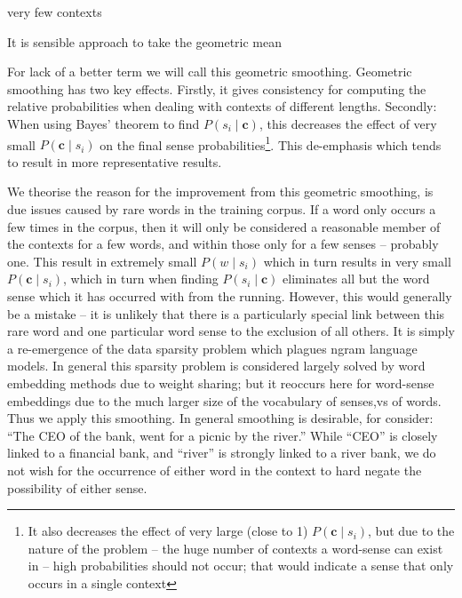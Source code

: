 \documentclass{sig-alternate}
\renewcommand{\c}{\mathbf{c}}
\begin{document}
 

very few contexts 


It is sensible approach to take the geometric mean


For lack of a better term we will call this geometric smoothing. Geometric smoothing has two key effects. Firstly, it gives consistency for computing the relative  probabilities when dealing with contexts of different lengths. Secondly: When using Bayes' theorem to find $P(s_{i} \mid \c)$, this decreases the effect of very small $P(\c \mid s_{i})$ on the final sense probabilities\footnote{It also decreases the effect of very large (close to 1) $P(\c \mid s_{i})$, but due to the nature of the problem -- the huge number of contexts a word-sense can exist in -- high probabilities should not occur; that would indicate a sense that only occurs in a single context}. This de-emphasis which tends to result in more representative results.

We theorise the reason for the improvement from this geometric smoothing, is due issues caused by rare words in the training corpus. If a word only occurs a few times in the corpus, then it will only be considered a reasonable member of the contexts for a few words, and within those only for a few senses -- probably one. This result in extremely small $P(w \mid s_i)$ which in turn results in very small $P(\c \mid s_i)$, which in turn when finding $P(s_{i} \mid \c)$ eliminates all but the word sense which it has occurred with from the running. However, this would generally be a mistake -- it is unlikely that there is a particularly special link between this rare word and one particular word sense to the exclusion of all others. It is simply a re-emergence of the data sparsity problem which plagues ngram language models. In general this sparsity problem is considered largely solved by word embedding methods due to weight sharing; but it reoccurs here for word-sense embeddings due to the much larger size of the vocabulary of senses,vs of words. Thus we apply this smoothing. In general smoothing is desirable, for consider: \enquote{The CEO of the bank, went for a picnic by the river.} While \enquote{CEO} is closely linked to a financial bank, and \enquote{river} is strongly linked to a river bank, we do not wish for the occurrence of either word in the context to hard negate the possibility of either sense.
\end{document}
